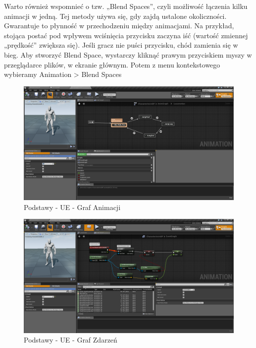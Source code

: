 \documentclass[openright]{xmgr}
\begin{document}
Warto również wspomnieć o tzw. „Blend Spaces”, czyli możliwość łączenia kilku animacji w jedną. Tej metody używa się, gdy zajdą ustalone okoliczności. Gwarantuje to płynność w przechodzeniu między animacjami. Na przykład, stojąca postać pod wpływem wciśnięcia przycisku zaczyna iść (wartość zmiennej „prędkość” zwiększa się). Jeśli gracz nie puści przycisku, chód zamienia się w bieg.
Aby stworzyć Blend Space, wystarczy kliknąć prawym przyciskiem myszy w przeglądarce plików, w ekranie głównym. Potem z menu kontekstowego wybieramy Animation > Blend Spaces

\newpage
\begin{figure}[!htb]
    \begin{center}
    \includegraphics[scale=0.2]{Screeny/AnimGraph_Event}
    \end{center}
    \caption{Podstawy - UE - Graf Animacji}
\end{figure}

\begin{figure}[!htb]
    \begin{center}
    \includegraphics[scale=0.2]{Screeny/EventGraph_Event}
    \end{center}
    \caption{Podstawy - UE - Graf Zdarzeń}
\end{figure}
\end{document}
